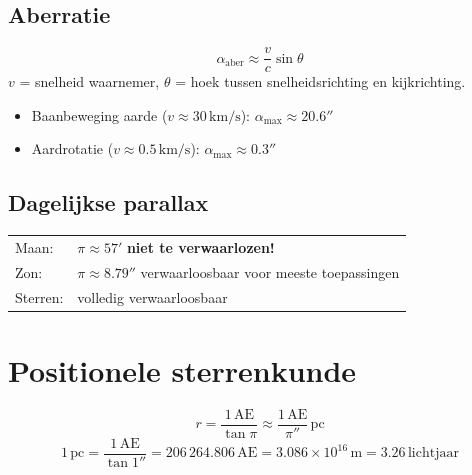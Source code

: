 \documentclass[11pt, a4paper]{article}
\newcommand{\boogmin}{'}
\newcommand{\boogsec}{''}
\newcommand{\AEm}{\mathrm{AE}}
\begin{document}
\subsection{Aberratie}

\begin{formule}[Aberratiehoek]
\[
  \alpha_\mathrm{aber} \approx \frac{v}{c}\sin\theta
\]
$v$ = snelheid waarnemer, $\theta$ = hoek tussen snelheidsrichting en kijkrichting.
\begin{itemize}[leftmargin=1.5em, itemsep=1pt]
  \item Baanbeweging aarde ($v \approx 30\,\mathrm{km/s}$): $\alpha_\mathrm{max} \approx 20.6\boogsec$
  \item Aardrotatie ($v \approx 0.5\,\mathrm{km/s}$): $\alpha_\mathrm{max} \approx 0.3\boogsec$
\end{itemize}
\end{formule}

\subsection{Dagelijkse parallax}

\begin{weetje}
\renewcommand{\arraystretch}{1.2}
\begin{tabular}{ll}
  Maan:  & $\pi \approx 57\boogmin$ \quad \textbf{niet te verwaarlozen!} \\
  Zon:   & $\pi \approx 8.79\boogsec$ \quad verwaarloosbaar voor meeste toepassingen \\
  Sterren: & volledig verwaarloosbaar \\
\end{tabular}
\end{weetje}

\section{Positionele sterrenkunde}

\begin{formule}
\[
  r = \frac{1\,\AEm}{\tan\pi} \approx \frac{1\,\AEm}{\pi''}\,\mathrm{pc}
\]
\[
  1\,\mathrm{pc} = \frac{1\,\AEm}{\tan 1\boogsec} = 206\,264.806\,\AEm
               = 3.086\times10^{16}\,\mathrm{m} = 3.26\,\mathrm{lichtjaar}
\]
\end{formule}
\end{document}
